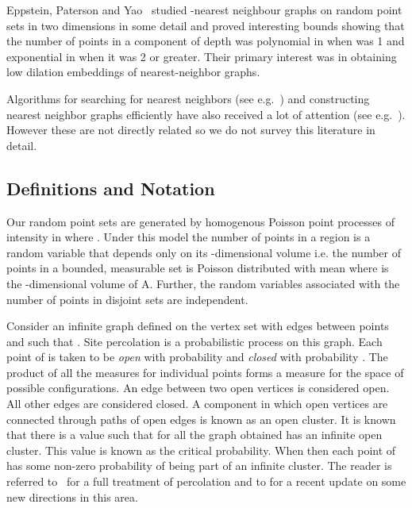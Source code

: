 \documentclass[11pt]{article}
\begin{document}
Eppstein, Paterson and Yao~\cite{eppstein-dcg:1997} studied
-nearest neighbour graphs on random point sets in two dimensions in
some detail and proved interesting bounds showing that the number of
points in a component of depth  was polynomial in  when  was
1 and exponential in  when it was 2 or greater. Their primary
interest was in obtaining low dilation embeddings of nearest-neighbor
graphs.

Algorithms for searching for nearest neighbors (see
e.g.~\cite{clarkson:2005,vaidya-dcg:1989}) and constructing nearest
neighbor graphs efficiently have also received a lot of attention (see
e.g.~\cite{paredes-wea:2006}). However these are not directly related
so we do not survey this literature in detail.


\subsection{Definitions and Notation}
\label{sec:intro:definitions}

 Our random point sets are
generated by homogenous Poisson point processes of intensity 
in  where . Under this model the number of points in a
region is a random variable that depends only on its -dimensional
volume i.e. the number of points in a bounded, measurable set  is
Poisson distributed with mean  where  is the
-dimensional volume of A. Further, the random variables associated
with the number of points in disjoint sets are independent.

 Consider an infinite graph defined on
the vertex set  with edges between points  and  such that
. Site percolation is a probabilistic process
on this graph. Each point of  is taken to be {\em open} with
probability  and {\em closed} with probability . The product
of all the measures for individual points forms a measure for the
space of possible configurations. An edge between two open vertices is
considered open. All other edges are considered closed. A component in
which open vertices are connected through paths of open edges is known
as an open cluster. It is known that there is a value  such that
for all  the graph obtained has an infinite open
cluster. This value is known as the critical probability. When  then each point of  has some non-zero probability of being
part of an infinite cluster. The reader is referred
to~\cite{grimmett:1999} for a full treatment of percolation and to
\cite{bollobas:2006} for a recent update on some new directions in
this area.
\end{document}
